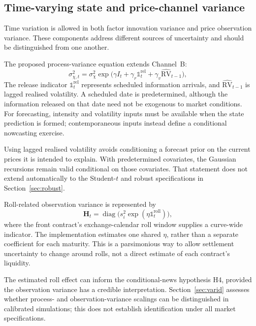 \documentclass[journal]{IEEEtran}
\begin{document}
\subsection{Time-varying state and price-channel variance}
\label{sec:QH}

Time variation is allowed in both factor innovation variance and price observation variance. These components address different sources of uncertainty and should be distinguished from one another.

The proposed process-variance equation extends Channel~B:
\begin{equation}
  \sigma_{\chi,t}^{2}
    = \sigma_\chi^{2}\exp\!\bigl(\gamma I_t + \gamma_r \mathbb{1}_t^{\text{rel}}
      + \gamma_v \widehat{\mathrm{RV}}_{t-1}\bigr) ,
  \label{eq:Qt}
\end{equation}
The release indicator $\mathbb{1}_t^{\mathrm{rel}}$ represents scheduled information arrivals, and $\widehat{\mathrm{RV}}_{t-1}$ is lagged realised volatility. A scheduled date is predetermined, although the information released on that date need not be exogenous to market conditions. For forecasting, intensity and volatility inputs must be available when the state prediction is formed; contemporaneous inputs instead define a conditional nowcasting exercise.

Using lagged realised volatility avoids conditioning a forecast prior on the current prices it is intended to explain. With predetermined covariates, the Gaussian recursions remain valid conditional on those covariates. That statement does not extend automatically to the Student-$t$ and robust specifications in Section~\ref{sec:robust}.

Roll-related observation variance is represented by
\begin{equation}
  \bm{H}_t = \operatorname{diag}\!\bigl(s_i^{2}
    \exp(\eta \mathbb{1}_t^{\text{roll}})\bigr) ,
  \label{eq:Ht}
\end{equation}
where the front contract's exchange-calendar roll window supplies a curve-wide indicator. The implementation estimates one shared $\eta$, rather than a separate coefficient for each maturity. This is a parsimonious way to allow settlement uncertainty to change around rolls, not a direct estimate of each contract's liquidity.

The estimated roll effect can inform the conditional-news hypothesis H4, provided the observation variance has a credible interpretation. Section~\ref{sec:varid} assesses whether process- and observation-variance scalings can be distinguished in calibrated simulations; this does not establish identification under all market specifications.
\end{document}
